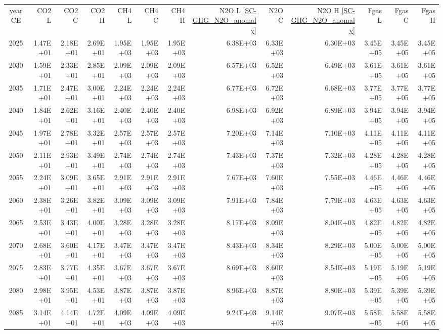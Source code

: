 \documentclass{article}
\begin{document}
\begin{table}
\begin{tabular}{crrr|rrr|rrr|rrr}
year CE  & CO2 L    & CO2 C    & CO2 H    & CH4 L    & CH4 C    & CH4 H    & N2O L \ref{SC-GHG_N2O_anomaly}     & N2O C      & N2O H \ref{SC-GHG_N2O_anomaly}    & Fgas L   & Fgas C   & Fgas H   \\
2025     & 1.47E+01 & 2.18E+01 & 2.69E+01 & 1.95E+03 & 1.95E+03 & 1.95E+03 & 6.38E+03 & 6.33E+03 & 6.30E+03 & 3.45E+05 & 3.45E+05 & 3.45E+05 \\
2030     & 1.59E+01 & 2.33E+01 & 2.85E+01 & 2.09E+03 & 2.09E+03 & 2.09E+03 & 6.57E+03 & 6.52E+03 & 6.49E+03 & 3.61E+05 & 3.61E+05 & 3.61E+05 \\
2035     & 1.71E+01 & 2.47E+01 & 3.00E+01 & 2.24E+03 & 2.24E+03 & 2.24E+03 & 6.77E+03 & 6.72E+03 & 6.68E+03 & 3.77E+05 & 3.77E+05 & 3.77E+05 \\
2040     & 1.84E+01 & 2.62E+01 & 3.16E+01 & 2.40E+03 & 2.40E+03 & 2.40E+03 & 6.98E+03 & 6.92E+03 & 6.89E+03 & 3.94E+05 & 3.94E+05 & 3.94E+05 \\
2045     & 1.97E+01 & 2.78E+01 & 3.32E+01 & 2.57E+03 & 2.57E+03 & 2.57E+03 & 7.20E+03 & 7.14E+03 & 7.10E+03 & 4.11E+05 & 4.11E+05 & 4.11E+05 \\
2050     & 2.11E+01 & 2.93E+01 & 3.49E+01 & 2.74E+03 & 2.74E+03 & 2.74E+03 & 7.43E+03 & 7.37E+03 & 7.32E+03 & 4.28E+05 & 4.28E+05 & 4.28E+05 \\
2055     & 2.24E+01 & 3.09E+01 & 3.65E+01 & 2.91E+03 & 2.91E+03 & 2.91E+03 & 7.67E+03 & 7.60E+03 & 7.55E+03 & 4.46E+05 & 4.46E+05 & 4.46E+05 \\
2060     & 2.38E+01 & 3.26E+01 & 3.82E+01 & 3.09E+03 & 3.09E+03 & 3.09E+03 & 7.91E+03 & 7.84E+03 & 7.79E+03 & 4.63E+05 & 4.63E+05 & 4.63E+05 \\
2065     & 2.53E+01 & 3.43E+01 & 4.00E+01 & 3.28E+03 & 3.28E+03 & 3.28E+03 & 8.17E+03 & 8.09E+03 & 8.04E+03 & 4.82E+05 & 4.82E+05 & 4.82E+05 \\
2070     & 2.68E+01 & 3.60E+01 & 4.17E+01 & 3.47E+03 & 3.47E+03 & 3.47E+03 & 8.43E+03 & 8.34E+03 & 8.29E+03 & 5.00E+05 & 5.00E+05 & 5.00E+05 \\
2075     & 2.83E+01 & 3.77E+01 & 4.35E+01 & 3.67E+03 & 3.67E+03 & 3.67E+03 & 8.69E+03 & 8.60E+03 & 8.54E+03 & 5.19E+05 & 5.19E+05 & 5.19E+05 \\
2080     & 2.98E+01 & 3.95E+01 & 4.53E+01 & 3.87E+03 & 3.87E+03 & 3.87E+03 & 8.96E+03 & 8.87E+03 & 8.80E+03 & 5.39E+05 & 5.39E+05 & 5.39E+05 \\
2085     & 3.14E+01 & 4.14E+01 & 4.72E+01 & 4.09E+03 & 4.09E+03 & 4.09E+03 & 9.24E+03 & 9.14E+03 & 9.07E+03 & 5.58E+05 & 5.58E+05 & 5.58E+05 \\

\end{tabular}
\end{table}
\end{document}
